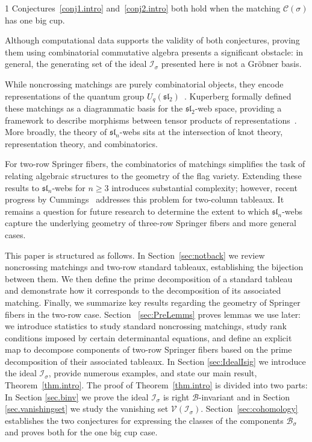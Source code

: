 \documentclass[11pt]{amsart}
\theoremstyle{remark}
\theoremstyle{remark}
\theoremstyle{definition}
\theoremstyle{definition}
\theoremstyle{definition}
\numberwithin{equation}{section}
\newcommand{\gs}{\sigma}
\newcommand{\cc}{\mathcal{C}}
\newcommand{\ci}{\mathcal{I}}
\newcommand{\cv}{\mathcal{V}}
\newcommand{\SF}{\mathcal{B}}
\newcommand{\cupsigma}{\cc(\gs)}
\begin{document}
\begin{customprop}{1} Conjectures~\ref{conj1.intro} and~\ref{conj2.intro} both hold when the matching $\cupsigma$ has one big cup. 
\end{customprop}

Although computational data supports the validity of both conjectures, proving them using combinatorial commutative algebra presents a significant obstacle: in general, the generating set of the ideal $\ci_\gs$ presented here is not a Gr\"obner basis. 



While noncrossing matchings are purely combinatorial objects, they encode representations of the quantum group $U_q(\mathfrak{sl}_2)$~\cite{CautisKamnitzerMorrison2014}. Kuperberg formally defined these matchings as a diagrammatic basis for the $\mathfrak{sl}_2$-web space, providing a framework to describe morphisms between tensor products of representations~\cite{TemperleyLieb1971,Kuperberg1996}. More broadly, the theory of $\mathfrak{sl}_n$-webs sits at the intersection of knot theory, representation theory, and combinatorics.

For two-row Springer fibers, the combinatorics of matchings simplifies the task of relating algebraic structures to the geometry of the flag variety. Extending these results to $\mathfrak{sl}_n$-webs for $n \geq 3$ introduces substantial complexity; however, recent progress by Cummings~\cite{Cummings2026} addresses this problem for two-column tableaux. It remains a question for future research to determine the extent to which $\mathfrak{sl}_n$-webs capture the underlying geometry of three-row Springer fibers and more general cases.


This paper is structured as follows. In Section~\ref{sec:notback} we review noncrossing matchings and two-row standard tableaux, establishing the bijection between them. We then define the prime decomposition of a standard tableau and demonstrate how it corresponds to the decomposition of its associated matching. Finally, we summarize key results regarding the geometry of Springer fibers in the two-row case.  Section ~\ref{sec:PreLemms} proves lemmas we use later: we introduce statistics to study standard noncrossing matchings, study rank conditions imposed by certain determinantal equations, and define an explicit map to decompose components of two-row Springer fibers based on the prime decomposition of their associated tableaux. In Section \ref{sec:IdealIsig} we introduce the ideal $\ci_\gs$, provide numerous examples, and state our main result, Theorem~\ref{thm.intro}. 
The proof of Theorem~\ref{thm.intro} is divided into two parts: In Section \ref{sec.binv} we prove the ideal $\ci_\gs$ is right $\mathcal{B}$-invariant and in Section \ref{sec.vanishingset} we study the vanishing set $\cv(\ci_\gs)$. Section~\ref{sec:cohomology} establishes the two conjectures for expressing the classes of the components $\SF_\gs$ and proves both for the one big cup case.
\end{document}
